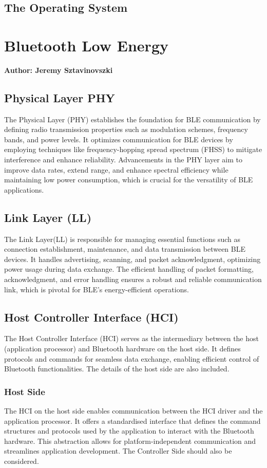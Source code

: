 \subsection{The Operating System}

\section{Bluetooth Low Energy}
\textbf{Author: Jeremy Sztavinovszki}

\subsection{Physical Layer PHY}
The Physical Layer (PHY) establishes the foundation for BLE communication by defining radio transmission properties such as modulation schemes, frequency bands, and power levels. It optimizes communication for BLE devices by employing techniques like frequency-hopping spread spectrum (FHSS) to mitigate interference and enhance reliability. Advancements in the PHY layer aim to improve data rates, extend range, and enhance spectral efficiency while maintaining low power consumption, which is crucial for the versatility of BLE applications.
  
\subsection{Link Layer (LL)}
The Link Layer(LL)
is responsible for managing essential functions such as connection establishment, maintenance, and data transmission between BLE devices. It handles advertising, scanning, and packet acknowledgment, optimizing power usage during data exchange. The efficient handling of packet formatting, acknowledgment, and error handling ensures a robust and reliable communication link, which is pivotal for BLE's energy-efficient operations.

\subsection{Host Controller Interface (HCI)}
The Host Controller Interface (HCI)
serves as the intermediary between the host (application processor) and Bluetooth hardware on the host side. It defines protocols and commands for seamless data exchange, enabling efficient control of Bluetooth functionalities.
The details of the host side are also included.

\subsubsection{Host Side}
The HCI on the host side enables communication between the HCI driver and the application processor. It offers a standardised interface that defines the command structures and protocols used by the application to interact with the Bluetooth hardware. This abstraction allows for platform-independent communication and streamlines application development.
The Controller Side should also be considered.

